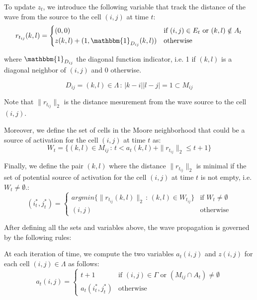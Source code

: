 \documentclass[../main.tex]{subfiles}
\begin{document}
\vspace{1em}


To update $z_t$, we introduce the following variable that track the distance of the wave from the source to the cell $(i, j)$ at time $t$: 
$$r_{t_{ij}} (k, l) = \begin{cases}
	(0, 0) & \text{if } (i, j) \in {E}_{t} \text{ or } (k, l) \notin A_t\\
	z(k, l) + (1, \mathbbm{1}_{D_{ij}}(k, l)) & \text{otherwise}
\end{cases}$$

where $\mathbbm{1}_{D_{ij}}$ the diagonal function indicator, i.e. 1 if $(k, l)$ is a diagonal neighbor of $(i, j)$ and $0$ otherwise.

$$D_{ij} = {(k, l) \in \Lambda \,:\, |k - i||l - j| = 1} \subset M_{ij}$$

Note that $\| r_{t_{ij}} \|_2$ is the distance mesurement from the wave source to the cell $(i, j)$.

\vspace{1em}
Moreover, we define the set of cells in the Moore neighborhood that could be a source of activation for the cell $(i, j)$ at time $t$ as:
$$ W_t = \{(k, l) \in M_{ij} \,:\, t < a_t (k, l) + \| r_{t_{ij}} \|_2 \leq t+1\}$$

\vspace{1em}
Finally, we define the pair $(k, l)$ where the distance $\| r_{t_{ij}} \|_2$ is minimal if the set of potential source of activation for the cell $(i, j)$ at time $t$ is not empty, i.e. $W_t \neq \emptyset$.:
$$(i_t^{*}, j_t^{*}) = 
\begin{cases}
	argmin\{\| r_{t_{ij}} (k, l)\|_2 \,:\, (k, l) \in W_{t_{ij}}\} & \text{if }  W_t \neq \emptyset\\
	(i, j) & \text{otherwise}
\end{cases}
$$


\vspace{1em}
After defining all the sets and variables above, the wave propagation is governed by the following rules:

\vspace{1em}

At each iteration of time, we compute the two variables $a_t (i, j)$ and $z(i, j)$ for each cell $(i, j) \in \Lambda$ as follows:
$$a_t (i, j) = 
\begin{cases}
	t +1 & \text{if }  (i, j) \in \Gamma \text{ or } (M_{ij} \cap  A_t) \neq \emptyset\\
	a_t(i_t^{*}, j_t^{*}) & \text{otherwise}
\end{cases}
$$
\end{document}

